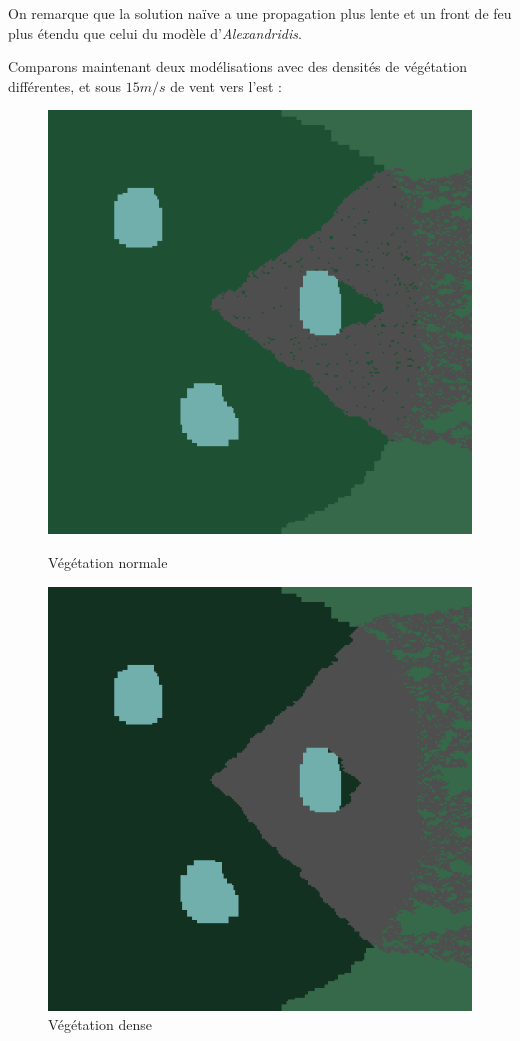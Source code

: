 \documentclass[12pt]{article}
\begin{document}
On remarque que la solution naïve a une propagation plus lente et un front de feu plus étendu que celui du modèle d'\textit{Alexandridis}.

Comparons maintenant deux modélisations avec des densités de végétation différentes, et sous $15 m/s$ de vent vers l'est :

\begin{figure}[!h]
    \centering
    \begin{minipage}{0.35\textwidth}
      \centering
      \includegraphics[width=.8\linewidth]{pictures/model2/land_200_wind_notdense.png}
      \caption{Végétation normale}\label{Fig:Data3}
    \end{minipage}\hfil
    \begin{minipage}{0.35\textwidth}
      \centering
      \includegraphics[width=.8\linewidth]{pictures/model2/land_200_wind_dense.png}
      \caption{Végétation dense}\label{Fig:Data4}
    \end{minipage}
 \end{figure}
\end{document}
